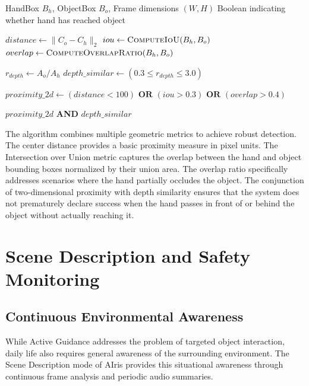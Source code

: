 \documentclass[12pt,a4paper]{report}
\begin{document}
\begin{algorithm}[H]
\caption{Determine if Hand Has Reached Object}
\begin{algorithmic}[1]
\Require HandBox $B_h$, ObjectBox $B_o$, Frame dimensions $(W, H)$
\Ensure Boolean indicating whether hand has reached object

\State $distance \gets \|C_o - C_h\|_2$ 
\State $iou \gets \textsc{ComputeIoU}(B_h, B_o)$ 
\State $overlap \gets \textsc{ComputeOverlapRatio}(B_h, B_o)$ 

\State $r_{depth} \gets A_o / A_h$ 
\State $depth\_similar \gets (0.3 \leq r_{depth} \leq 3.0)$

\State $proximity\_2d \gets (distance < 100) \textbf{ OR } (iou > 0.3) \textbf{ OR } (overlap > 0.4)$

\State \Return $proximity\_2d$ \textbf{ AND } $depth\_similar$
\end{algorithmic}
\end{algorithm}

The algorithm combines multiple geometric metrics to achieve robust detection. The center distance provides a basic proximity measure in pixel units. The Intersection over Union metric captures the overlap between the hand and object bounding boxes normalized by their union area. The overlap ratio specifically addresses scenarios where the hand partially occludes the object. The conjunction of two-dimensional proximity with depth similarity ensures that the system does not prematurely declare success when the hand passes in front of or behind the object without actually reaching it.


\chapter{Scene Description and Safety Monitoring}

\section{Continuous Environmental Awareness}

While Active Guidance addresses the problem of targeted object interaction, daily life also requires general awareness of the surrounding environment. The Scene Description mode of AIris provides this situational awareness through continuous frame analysis and periodic audio summaries.
\end{document}
